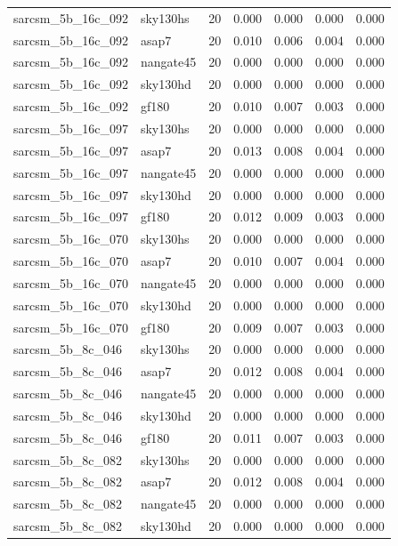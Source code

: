 \begin{tabular}{llrrrrr}
sarcsm\_5b\_16c\_092 & sky130hs & 20 & 0.000 & 0.000 & 0.000 & 0.000 \\
sarcsm\_5b\_16c\_092 & asap7 & 20 & 0.010 & 0.006 & 0.004 & 0.000 \\
sarcsm\_5b\_16c\_092 & nangate45 & 20 & 0.000 & 0.000 & 0.000 & 0.000 \\
sarcsm\_5b\_16c\_092 & sky130hd & 20 & 0.000 & 0.000 & 0.000 & 0.000 \\
sarcsm\_5b\_16c\_092 & gf180 & 20 & 0.010 & 0.007 & 0.003 & 0.000 \\
sarcsm\_5b\_16c\_097 & sky130hs & 20 & 0.000 & 0.000 & 0.000 & 0.000 \\
sarcsm\_5b\_16c\_097 & asap7 & 20 & 0.013 & 0.008 & 0.004 & 0.000 \\
sarcsm\_5b\_16c\_097 & nangate45 & 20 & 0.000 & 0.000 & 0.000 & 0.000 \\
sarcsm\_5b\_16c\_097 & sky130hd & 20 & 0.000 & 0.000 & 0.000 & 0.000 \\
sarcsm\_5b\_16c\_097 & gf180 & 20 & 0.012 & 0.009 & 0.003 & 0.000 \\
sarcsm\_5b\_16c\_070 & sky130hs & 20 & 0.000 & 0.000 & 0.000 & 0.000 \\
sarcsm\_5b\_16c\_070 & asap7 & 20 & 0.010 & 0.007 & 0.004 & 0.000 \\
sarcsm\_5b\_16c\_070 & nangate45 & 20 & 0.000 & 0.000 & 0.000 & 0.000 \\
sarcsm\_5b\_16c\_070 & sky130hd & 20 & 0.000 & 0.000 & 0.000 & 0.000 \\
sarcsm\_5b\_16c\_070 & gf180 & 20 & 0.009 & 0.007 & 0.003 & 0.000 \\
sarcsm\_5b\_8c\_046 & sky130hs & 20 & 0.000 & 0.000 & 0.000 & 0.000 \\
sarcsm\_5b\_8c\_046 & asap7 & 20 & 0.012 & 0.008 & 0.004 & 0.000 \\
sarcsm\_5b\_8c\_046 & nangate45 & 20 & 0.000 & 0.000 & 0.000 & 0.000 \\
sarcsm\_5b\_8c\_046 & sky130hd & 20 & 0.000 & 0.000 & 0.000 & 0.000 \\
sarcsm\_5b\_8c\_046 & gf180 & 20 & 0.011 & 0.007 & 0.003 & 0.000 \\
sarcsm\_5b\_8c\_082 & sky130hs & 20 & 0.000 & 0.000 & 0.000 & 0.000 \\
sarcsm\_5b\_8c\_082 & asap7 & 20 & 0.012 & 0.008 & 0.004 & 0.000 \\
sarcsm\_5b\_8c\_082 & nangate45 & 20 & 0.000 & 0.000 & 0.000 & 0.000 \\
sarcsm\_5b\_8c\_082 & sky130hd & 20 & 0.000 & 0.000 & 0.000 & 0.000 \\

\end{tabular}
